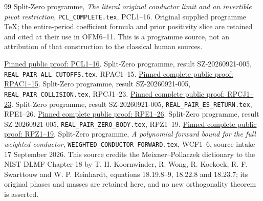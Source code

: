 \documentclass[11pt]{article}
\begin{document}
\begin{thebibliography}{99}
 Split-Zero programme,
\emph{The literal original conductor limit and an invertible pivot restriction},
\texttt{PCL\_COMPLETE.tex}, PCL1--16. Original supplied programme TeX;
the entire-period coefficient formula and prior positivity slice are
retained and cited at their use in OFM6--11. This is a programme source,
not an attribution of that construction to the classical human sources.



\href{https://github.com/KokunoYumeto/zeta-function-research-reader/blob/487253b5b01851da5b9b98af4e146fecf1fab902/workbenches/splitzero-tandem/continuations/20260919-native-conductor-coprimality/providers/PCL_COMPLETE.tex#L19}{Pinned public proof: PCL1--16}.
 Split-Zero programme, result SZ-20260921-005, \nolinkurl{REAL_PAIR_ALL_CUTOFFS.tex}, RPAC1--15. \href{https://github.com/KokunoYumeto/zeta-function-research-reader/blob/0fd693c844aad9117e30ec447c59864a28af10f3/workbenches/splitzero-tandem/continuations/20260921-native-spectral-real-pair/005/REAL_PAIR_ALL_CUTOFFS.tex#L14}{Pinned complete public proof: RPAC1--15}.
 Split-Zero programme, result SZ-20260921-005, \nolinkurl{REAL_PAIR_COLLISION.tex}, RPCJ1--23. \href{https://github.com/KokunoYumeto/zeta-function-research-reader/blob/0fd693c844aad9117e30ec447c59864a28af10f3/workbenches/splitzero-tandem/continuations/20260921-native-spectral-real-pair/005/REAL_PAIR_COLLISION.tex#L20}{Pinned complete public proof: RPCJ1--23}.
 Split-Zero programme, result SZ-20260921-005, \nolinkurl{REAL_PAIR_ES_RETURN.tex}, RPE1--26. \href{https://github.com/KokunoYumeto/zeta-function-research-reader/blob/0fd693c844aad9117e30ec447c59864a28af10f3/workbenches/splitzero-tandem/continuations/20260921-native-spectral-real-pair/005/REAL_PAIR_ES_RETURN.tex#L18}{Pinned complete public proof: RPE1--26}.
 Split-Zero programme, result SZ-20260921-005, \nolinkurl{REAL_PAIR_ZERO_BODY.tex}, RPZ1--19. \href{https://github.com/KokunoYumeto/zeta-function-research-reader/blob/0fd693c844aad9117e30ec447c59864a28af10f3/workbenches/splitzero-tandem/continuations/20260921-native-spectral-real-pair/005/REAL_PAIR_ZERO_BODY.tex#L18}{Pinned complete public proof: RPZ1--19}.
 Split-Zero programme, \emph{A polynomial forward bound for
the full weighted conductor}, \texttt{WEIGHTED\_CONDUCTOR\_FORWARD.tex},
WCF1--6, source intake 17 September 2026. This source credits the
Meixner--Pollaczek dictionary to the NIST DLMF Chapter 18 by T. H. Koornwinder, R. Wong, R. Koekoek, R. F. Swarttouw and W. P. Reinhardt, equations
18.19.8--9, 18.22.8 and 18.23.7; its original phases and masses are
retained here, and no new orthogonality theorem is asserted.


\end{thebibliography}
\end{document}
